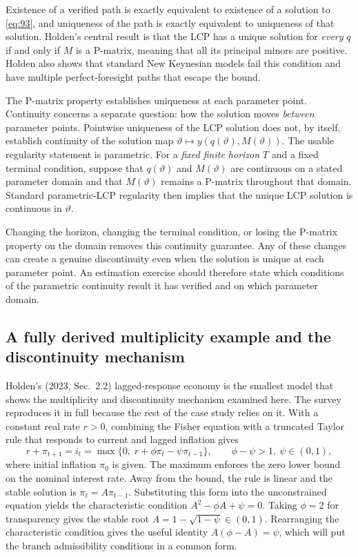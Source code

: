 \documentclass[11pt]{article}
\begin{document}
Existence of a verified path is exactly equivalent to existence of a solution
to \eqref{eq:93}, and uniqueness of the path is exactly equivalent to
uniqueness of that solution. Holden's central result is that the LCP has a
unique solution for \emph{every} $q$ if and only if
$M$ is a P-matrix, meaning that all its principal minors are
positive. Holden also shows that standard New Keynesian models fail this
condition and have multiple perfect-foresight paths that escape the bound.

The P-matrix property establishes uniqueness at each parameter point.
Continuity concerns a separate question: how the solution moves
\emph{between} parameter points. Pointwise uniqueness of the LCP solution does
not, by itself, establish continuity of the solution map
$\vartheta\mapsto y(q(\vartheta),M(\vartheta))$. The usable regularity statement is parametric.
For a \emph{fixed finite horizon} $T$ and a fixed terminal condition,
suppose that $q(\vartheta)$ and $M(\vartheta)$ are continuous on a stated
parameter domain and that $M(\vartheta)$ remains a P-matrix throughout that
domain. Standard parametric-LCP regularity then implies that the unique LCP
solution is continuous in $\vartheta$.

Changing the horizon, changing the terminal condition, or losing the P-matrix
property on the domain removes this continuity guarantee. Any of these changes
can create a genuine discontinuity even when the solution is unique at each
parameter point. An estimation exercise should therefore state which
conditions of the parametric continuity result it has verified and on which
parameter domain.

\subsection{A fully derived multiplicity example and the discontinuity mechanism}
\label{sec:nk-mult}

Holden's (2023, Sec.~2.2) lagged-response economy is the smallest model that shows the multiplicity and discontinuity mechanism examined here. The survey reproduces it in full because the rest of the case study relies on it. With a constant real rate $r>0$, combining the Fisher equation with a truncated Taylor rule that responds to current and lagged inflation gives
\begin{equation}\label{eq:94}
 r+\pi_{t+1}=i_t=\max\{0,\;r+\phi\pi_t-\psi\pi_{t-1}\},
 \qquad \phi-\psi>1,\ \psi\in(0,1),
\end{equation}
where initial inflation $\pi_0$ is given. The maximum enforces the zero lower bound on the nominal interest rate. Away from the bound, the rule is linear and the stable solution is $\pi_t=A\pi_{t-1}$. Substituting this form into the unconstrained equation yields the characteristic condition $A^{2}-\phi A+\psi=0$. Taking $\phi=2$ for transparency gives the stable root $A=1-\sqrt{1-\psi}\in(0,1)$. Rearranging the characteristic condition gives the useful identity $A(\phi-A)=\psi$, which will put the branch admissibility conditions in a common form.
\end{document}
